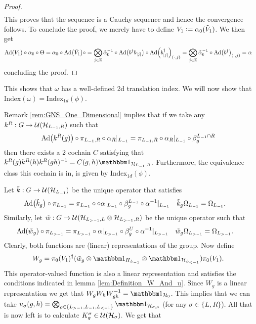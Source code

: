 \documentclass[11pt,a4paper,twoside]{article}
\numberwithin{equation}{section}
\begin{document}
\begin{proof}
\begin{align}
		\end{align}
		This proves that the sequence is a Cauchy sequence and hence the convergence follows. To conclude the proof, we merely have to define $V_1\vcentcolon= \alpha_0(\tilde{V}_1)$. We then get
		\begin{equation}
			\Ad{V_1}\circ \alpha_0\circ \Theta= \alpha_0\circ\Ad{\tilde V_1}\circ=\bigotimes_{j\in\ZZ}\tilde\alpha_0^{-1}\circ\Ad{b^\dagger b_\abs{j}}\circ \Ad{b_\abs{j}^\dagger}_{(\cdot,j)}=\bigotimes_{j\in\ZZ}\tilde\alpha_0^{-1}\circ\Ad{b^\dagger}_{(\cdot,j)}=\alpha
		\end{equation}
		concluding the proof.
	\end{proof}
	This shows that $\omega$ has a well-defined 2d translation index. We will now show that $\textrm{Index}(\omega)=\textrm{Index}_{1d}(\phi)$.
	\begin{remark}
		Remark \ref{rem:GNS_One_Dimensional} implies that if we take any $k^R:G\rightarrow \mathcal U(\mathcal H_{L_{-1},R})$ such that
		\begin{equation}
			\Ad{k^R(g)}\circ\pi_{L_{-1},R}\circ\alpha_R|_{L_{-1}}=\pi_{L_{-1},R}\circ\alpha_R|_{L_{-1}}\circ\beta_{g}^{L_{-1}\cap R}
		\end{equation}
		then there exists a 2 cochain $C$ satisfying that $k^R(g)k^R(h)k^R(gh)^{-1}=C(g,h)\id_{\HH_{L_{-1},R}}$. Furthermore, the equivalence class this cochain is in, is given by $\textrm{Index}_{1d}(\phi)$.
	\end{remark}
	Let $\tilde k:G\rightarrow \mathcal U(\mathcal H_{L_{-1}})$ be the unique operator that satisfies
	\begin{align}
		\Ad{\tilde{k}_g}\circ\pi_{L_{-1}}&=\pi_{L_{-1}}\circ \circ\alpha|_{L_{-1}}\circ\beta_g^{L_{-1}}\circ \alpha^{-1}|_{L_{-1}}&\tilde k_g\Omega_{L_{-1}}&=\Omega_{L_{-1}}.
	\end{align}
	Similarly, let $\tilde{w}:G\rightarrow\mathcal U(\mathcal H_{L_{>-1},L}\otimes\mathcal H_{L_{>-1},R})$ be the unique operator such that
	\begin{align}
		\Ad{\tilde w_{g}}\circ\pi_{L_{>-1}}&=\pi_{L_{>-1}}\circ\alpha|_{L_{>-1}}\circ\beta_g^{U}\circ \alpha^{-1}|_{L_{>-1}}&\tilde w_{g}\Omega_{L_{>-1}}&=\Omega_{L_{>-1}}.
	\end{align}
	Clearly, both functions are (linear) representations of the group. Now define
	\begin{equation}\label{eq:ChoiceOfW_g_ExampleH2Index}
		W_g=\pi_{0}(V_1)^{\dagger}(\tilde{w}_g\otimes\id_{H_{L_{-1}}}\otimes\id_{\HH_{L_{<-1}}}) \pi_{0}(V_1).
	\end{equation}
	This operator-valued function is also a linear representation and satisfies the conditions indicated in lemma \ref{lem:Definition_W_And_u}. Since $W_g$ is a linear representation we get that $W_gW_hW_{gh}^{-1}=\id_{\HH_0}$. This implies that we can take $u_\sigma(g,h)=\bigotimes_{\rho\in\{L_{>-1},L_{-1},L_{<-1}\}}\id_{\HH_{\sigma,\rho}}$ (for any $\sigma\in\{L,R\}$). All that is now left is to calculate $K^\sigma_g\in\mathcal U(\mathcal H_\sigma)$. We get that
\end{document}
